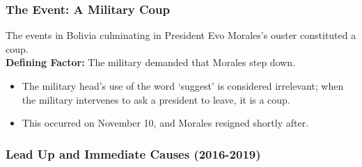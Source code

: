 \documentclass{article}
\begin{document}
    \subsubsection{The Event: A Military Coup}

    \noindent The events in Bolivia culminating in President Evo Morales's
ouster constituted a coup.\\

    \noindent \textbf{Defining Factor:} The military demanded that Morales
step down.
    \begin{itemize}
        \item The military head's use of the word `suggest' is considered
        irrelevant; when the military intervenes to ask a president to
        leave, it is a coup.
        \item This occurred on November 10, and Morales resigned shortly after.
    \end{itemize}

    \subsubsection{Lead Up and Immediate Causes (2016-2019)}
\end{document}
